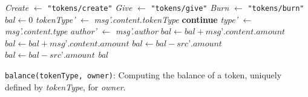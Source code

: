 \documentclass[sigplan,screen,10pt]{acmart}
\begin{document}
\begin{algorithm}
\begin{algorithmic}[1]
  \State \textit{Create} $\leftarrow$ \texttt{"tokens/create"}
  \State \textit{Give} $\leftarrow$ \texttt{"tokens/give"}
  \State \textit{Burn} $\leftarrow$ \texttt{"tokens/burn"}
  \State
  \State $\textit{bal} \leftarrow 0$
   \label{alg:balance:valid1}
    \State \textit{tokenType'} $\leftarrow$ \textit{msg'.content.tokenType}
      \textbf{continue}
    \EndIf
    \State
    \State \textit{type'} $\leftarrow$ \textit{msg'.content.type}
    \State \textit{author'} $\leftarrow$ \textit{msg'.author}
    	\State $\textit{bal} \leftarrow \textit{bal} + \textit{msg'.content.amount}$ \label{alg:balance:inc1}
             \State $\textit{bal} \leftarrow \textit{bal} + \textit{msg'.content.amount}$ \label{alg:balance:inc2}
        \EndIf
                 \State $\textit{bal} \leftarrow \textit{bal} - \textit{src'.amount}$ \label{alg:balance:dec1}
             \EndFor    
        \EndIf
             \State $\textit{bal} \leftarrow \textit{bal} - \textit{src'.amount}$ \label{alg:balance:dec2} 
         \EndFor    
    \EndIf
  \EndFor
  \State \Return \textit{bal}
\end{algorithmic}
\caption{\texttt{balance(tokenType, owner)}: Computing the balance of a token, uniquely defined by \textit{tokenType}, for \textit{owner}.}
\label{alg:balance}
\end{algorithm}
\end{document}
